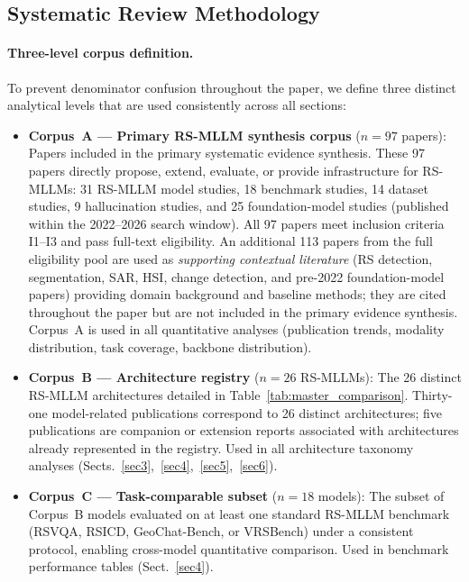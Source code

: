 \subsection{Systematic Review Methodology}\label{sec2:prisma}

\paragraph{Three-level corpus definition.}\label{sec2:corpus_def}
To prevent denominator confusion throughout the paper, we define three
distinct analytical levels that are used consistently across all sections:

\begin{itemize}
\item \textbf{Corpus~A --- Primary RS-MLLM synthesis corpus} ($n = 97$ papers):
Papers included in the primary systematic evidence synthesis. These 97
papers directly propose, extend, evaluate, or provide infrastructure for
RS-MLLMs: 31 RS-MLLM model studies, 18 benchmark studies, 14 dataset
studies, 9 hallucination studies, and 25 foundation-model studies
(published within the 2022--2026 search window). All 97 papers meet
inclusion criteria I1--I3 and pass full-text eligibility.
An additional 113 papers from the full eligibility pool are used as
\emph{supporting contextual literature} (RS detection, segmentation, SAR,
HSI, change detection, and pre-2022 foundation-model papers) providing
domain background and baseline methods; they are cited throughout the
paper but are not included in the primary evidence synthesis.
Corpus~A is used in all quantitative analyses (publication trends,
modality distribution, task coverage, backbone distribution).

\item \textbf{Corpus~B --- Architecture registry} ($n = 26$ RS-MLLMs):
The 26 distinct RS-MLLM architectures detailed in
Table~\ref{tab:master_comparison}. Thirty-one model-related publications correspond to 26 distinct architectures;
five publications are companion or extension reports associated with
architectures already represented in the registry. Used in all architecture taxonomy analyses
(Sects.~\ref{sec3},~\ref{sec4},~\ref{sec5},~\ref{sec6}).

\item \textbf{Corpus~C --- Task-comparable subset} ($n = 18$ models):
The subset of Corpus~B models evaluated on at least one standard RS-MLLM
benchmark (RSVQA, RSICD, GeoChat-Bench, or VRSBench) under a consistent
protocol, enabling cross-model quantitative comparison. Used in benchmark
performance tables (Sect.~\ref{sec4}).
\end{itemize}

